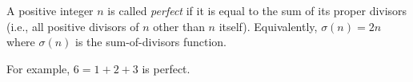 A positive integer $n$ is called \textit{perfect} if it is equal to the sum of its proper divisors (i.e., all positive divisors of $n$ other than $n$ itself). Equivalently, $\sigma(n) = 2n$ where $\sigma(n)$ is the sum-of-divisors function.

For example, $6 = 1 + 2 + 3$ is perfect.
